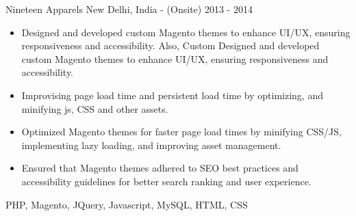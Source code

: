 \begin{projects}
    \project
    {Nineteen Apparels} {New Delhi, India - (Onsite)} {2013 - 2014}
    {}
    {\begin{itemize}
        \item Designed and developed custom Magento themes to enhance UI/UX, ensuring responsiveness and accessibility. Also, Custom Designed and developed custom Magento themes to enhance UI/UX, ensuring responsiveness and accessibility.
        \item Improvising page load time and persistent load time by optimizing, and minifying js, CSS and other assets.
        \item Optimized Magento themes for faster page load times by minifying CSS/JS, implementing lazy loading, and improving asset management.
        \item Ensured that Magento themes adhered to SEO best practices and accessibility guidelines for better search ranking and user experience.
    \end{itemize}}
    {PHP, Magento, JQuery, Javascript, MySQL, HTML, CSS}


\end{projects}

